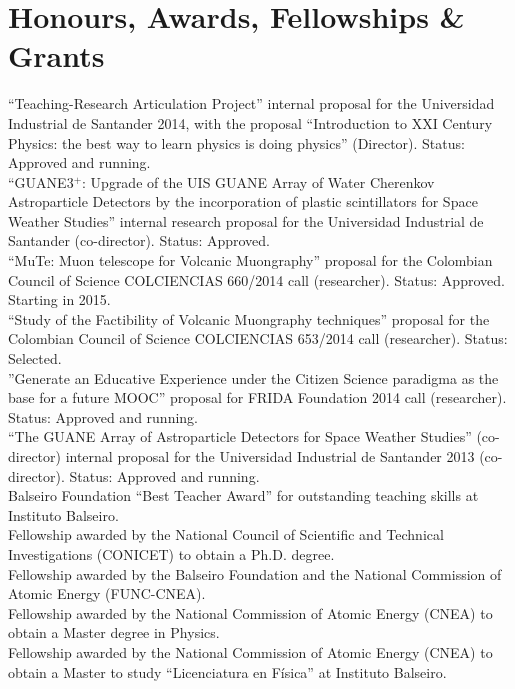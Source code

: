 \ifeng
\section*{Honours, Awards, Fellowships \& Grants}
\noindent
{} ``Teaching-Research Articulation Project'' internal proposal for the Universidad Industrial de Santander 2014, with the proposal ``Introduction to XXI Century Physics: the best way to learn physics is doing physics'' (Director). Status: Approved and running.\\
 ``GUANE3$^+$: Upgrade of the UIS GUANE Array of Water Cherenkov Astroparticle Detectors by the incorporation of plastic scintillators for Space Weather Studies'' internal research proposal for the Universidad Industrial de Santander (co-director). Status: Approved.\\
 ``MuTe: Muon telescope for Volcanic Muongraphy'' proposal for the Colombian Council of Science COLCIENCIAS 660/2014 call (researcher). Status: Approved. Starting in 2015.\\
 ``Study of the Factibility of Volcanic Muongraphy techniques'' proposal for the Colombian Council of Science COLCIENCIAS 653/2014 call (researcher). Status: Selected.\\
 ''Generate an Educative Experience under the Citizen Science paradigma as the base for a future MOOC'' proposal for FRIDA Foundation 2014 call (researcher). Status: Approved and running.\\ 
 ``The GUANE Array of Astroparticle Detectors for Space Weather Studies'' (co-director) internal proposal for the Universidad Industrial de Santander 2013 (co-director). Status: Approved and running.\\
Balseiro Foundation ``Best Teacher Award'' for outstanding teaching
skills at Instituto Balseiro.\\
Fellowship awarded by the National Council of Scientific and
Technical Investigations (CONICET) to obtain a Ph.D. degree.\\
Fellowship awarded by the Balseiro Foundation and the National
Commission of Atomic Energy (FUNC-CNEA).\\
Fellowship awarded by the National Commission of Atomic Energy
(CNEA) to obtain a Master degree in Physics.\\
Fellowship awarded by the National Commission of Atomic
Energy (CNEA) to obtain a Master to study ``Licenciatura en Física'' at
Instituto Balseiro.
\else
